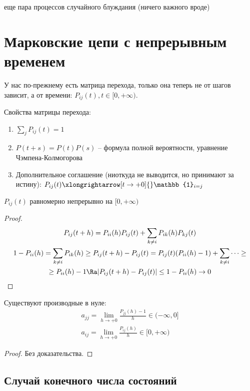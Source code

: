 \TODO еще пара процессов случайного блуждания (ничего важного вроде) \TODO

\section{Марковские цепи с непрерывным временем}
У нас по-прежнему есть матрица перехода, только она теперь не от шагов зависит, а от времени: $P_{ij}(t), t \in [0, +\infty)$.

Свойства матрицы перехода:
\begin{enumerate}
\item $\sum\limits_j P_{ij}(t) = 1$
\item $P(t+s) = P(t)P(s)$ -- формула полной вероятности, уравнение Чэмпена-Колмогорова
\item Дополнительное соглашение (ниоткуда не выводится, но принимают за истину): $P_{ij}(t) \xlongrightarrow[t \to +0]{} \mathbb{1}_{i=j}$
\end{enumerate}
 
\begin{theorem}
$P_{ij}(t)$ равномерно непрерывно на $[0, +\infty)$
\end{theorem}
\begin{proof}
\begin{gather*}
P_{ij}(t+h) = P_{ii}(h) P_{ij}(t) + \sum\limits_{k \neq i} P_{ik}(h) P_{kj}(t) \\
1 - P_{ii}(h) = \sum\limits_{k \neq i} P_{ik}(h) \geq P_{ij}(t+h) - P_{ij}(t) = P_{ij}(t)(P_{ii}(h) - 1) + \sum\limits_{k \neq i} \dots \geq \\
\geq P_{ii}(h) - 1 \Ra |P_{ij}(t+h) - P_{ij}(t)| \leq 1 - P_{ii}(h) \to 0
\end{gather*}
\end{proof}

\begin{theorem}
Существуют производные в нуле: 
\begin{gather*}
a_{jj} = \lim\limits_{h \to +0} \frac{P_{jj}(h) - 1}{h} \in (-\infty, 0] \\
a_{ij} = \lim\limits_{h \to +0} \frac{P_{ij}(h)}{h} \in [0, +\infty)
\end{gather*}
\end{theorem}
\begin{proof}
Без доказательства.
\end{proof}

\subsection{Случай конечного числа состояний}

